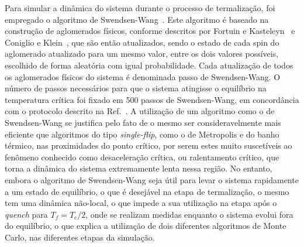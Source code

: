 Para simular a dinâmica do sistema durante o processo de termalização, foi empregado o algoritmo de Swendsen-Wang~\cite{SwendsenWang}. Este algoritmo é baseado na construção de aglomerados físicos, conforme descritos por Fortuin e Kasteleyn~\cite{FortuinKasteleyn} e Coniglio e Klein~\cite{ConiglioKlein}, que são então atualizados, sendo o estado de cada spin do aglomerado atualizado para um mesmo valor, entre os dois valores possíveis, escolhido de forma aleatória com igual probabilidade. Cada atualização de todos os aglomerados físicos do sistema é denominada passo de Swendsen-Wang. O número de passos necessários para que o sistema atingisse o equilíbrio na temperatura crítica foi fixado em 500 passos de Swendsen-Wang, em concordância com o protocolo descrito na Ref.~\cite{TeseMP}. A utilização de um algoritmo como o de Swendsen-Wang se justifica pelo fato de o mesmo ser consideravelmente mais eficiente que algoritmos do tipo \textit{single-flip}, como o de Metropolis e do banho térmico, nas proximidades do ponto crítico, por serem estes muito suscetíveis ao fenômeno conhecido como desaceleração crítica, ou ralentamento crítico, que torna a dinâmica do sistema extremamente lenta nessa região. No entanto, embora o algoritmo de Swendsen-Wang seja útil para levar o sistema rapidamente a um estado de equilíbrio, o que é desejável na etapa de termalização, o mesmo tem uma dinâmica não-local, o que impede a sua utilização na etapa após o \textit{quench} para $T_f=T_c/2$, onde se realizam medidas enquanto o sistema evolui fora do equilíbrio, o que explica a utilização de dois diferentes algoritmos de Monte Carlo, nas diferentes etapas da simulação. 

